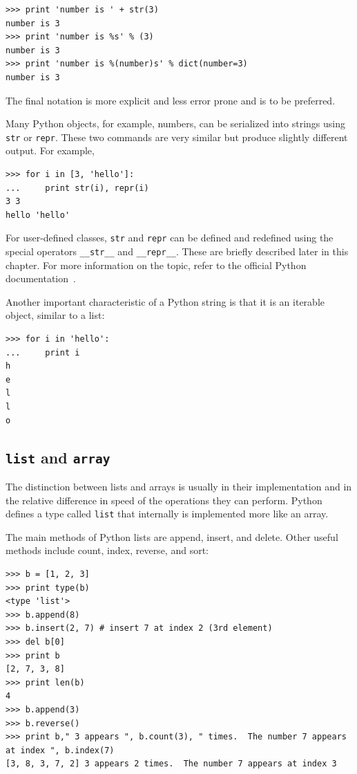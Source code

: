 \documentclass[justified,sixbynine]{tufte-book}
\def\ft{\small\tt}
\theoremstyle{plain}%
\theoremstyle{definition}
\theoremstyle{remark}
\begin{document}
\begin{fullwidth}
\begin{lstlisting}
>>> print 'number is ' + str(3)
number is 3
>>> print 'number is %s' % (3)
number is 3
>>> print 'number is %(number)s' % dict(number=3)
number is 3
\end{lstlisting}

The final notation is more explicit and less error prone and is to be preferred.

Many Python objects, for example, numbers, can be serialized into strings using {\ft str} or {\ft repr}. These two commands are very similar but produce slightly different output. For example,

\begin{lstlisting}
>>> for i in [3, 'hello']:
...     print str(i), repr(i)
3 3
hello 'hello'
\end{lstlisting}

For user-defined classes, {\ft str} and {\ft repr} can be defined and redefined using the special operators {\ft \_\_str\_\_} and {\ft \_\_repr\_\_}. These are briefly described later in this chapter. For more information on the topic, refer to the official Python documentation~\cite{pydocs}.

Another important characteristic of a Python string is that it is an iterable object, similar to a list:

\begin{lstlisting}
>>> for i in 'hello':
...     print i
h
e
l
l
o
\end{lstlisting}

\goodbreak\subsection{{\ft list} and {\ft array}}


The distinction between lists and arrays is usually in their implementation and in the relative difference in speed of the operations they can perform. Python defines a type called {\ft list} that internally is implemented more like an array.

The main methods of Python lists are append, insert, and delete.  Other useful methods include count, index, reverse, and sort:

\begin{lstlisting}
>>> b = [1, 2, 3]
>>> print type(b)
<type 'list'>
>>> b.append(8)
>>> b.insert(2, 7) # insert 7 at index 2 (3rd element)
>>> del b[0]
>>> print b
[2, 7, 3, 8]
>>> print len(b)
4
>>> b.append(3)
>>> b.reverse()
>>> print b," 3 appears ", b.count(3), " times.  The number 7 appears at index ", b.index(7)
[3, 8, 3, 7, 2] 3 appears 2 times.  The number 7 appears at index 3


\end{lstlisting}
\end{fullwidth}
\end{document}
